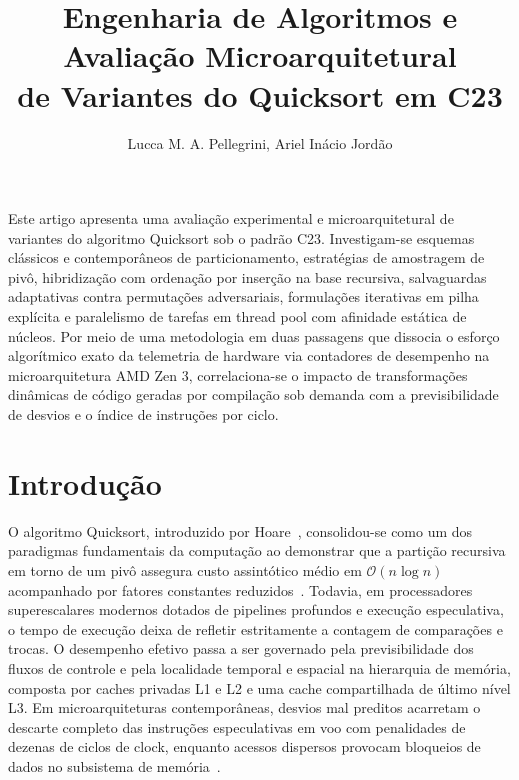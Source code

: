 \documentclass[12pt]{article}
\title{Engenharia de Algoritmos e Avaliação Microarquitetural\\de Variantes do Quicksort em C23}
\author{%
	Lucca M. A. Pellegrini,
	Ariel Inácio Jordão
}
\begin{document}
\maketitle

\begin{resumo}
	Este artigo apresenta uma avaliação experimental e microarquitetural de variantes do algoritmo Quicksort sob o padrão C23. Investigam-se esquemas clássicos e contemporâneos de particionamento, estratégias de amostragem de pivô, hibridização com ordenação por inserção na base recursiva, salvaguardas adaptativas contra permutações adversariais, formulações iterativas em pilha explícita e paralelismo de tarefas em thread pool com afinidade estática de núcleos. Por meio de uma metodologia em duas passagens que dissocia o esforço algorítmico exato da telemetria de hardware via contadores de desempenho na microarquitetura AMD Zen 3, correlaciona-se o impacto de transformações dinâmicas de código geradas por compilação sob demanda com a previsibilidade de desvios e o índice de instruções por ciclo.
\end{resumo}

\section{Introdução}\label{sec:intro}

O algoritmo Quicksort, introduzido por Hoare~\cite{Hoare1961,Hoare1962}, consolidou-se como um dos paradigmas fundamentais da computação ao demonstrar que a partição recursiva em torno de um pivô assegura custo assintótico médio em $\mathcal{O}(n \log n)$ acompanhado por fatores constantes reduzidos~\cite{Sedgewick1978,Knuth1998}. Todavia, em processadores superescalares modernos dotados de pipelines profundos e execução especulativa, o tempo de execução deixa de refletir estritamente a contagem de comparações e trocas. O desempenho efetivo passa a ser governado pela previsibilidade dos fluxos de controle e pela localidade temporal e espacial na hierarquia de memória, composta por caches privadas L1 e L2 e uma cache compartilhada de último nível L3. Em microarquiteturas contemporâneas, desvios mal preditos acarretam o descarte completo das instruções especulativas em voo com penalidades de dezenas de ciclos de clock, enquanto acessos dispersos provocam bloqueios de dados no subsistema de memória~\cite{EdelkampWeiss2016}.
\end{document}
